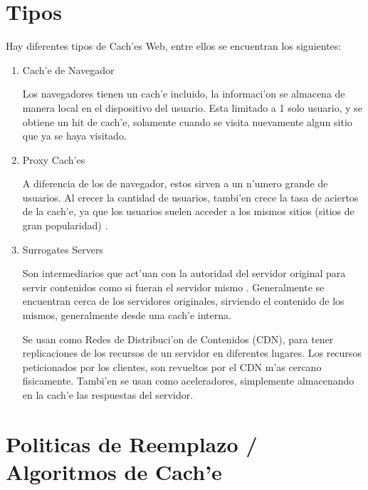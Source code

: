\section{Tipos}

Hay diferentes tipos de Cach'es Web, entre ellos se encuentran los siguientes:

\begin{enumerate}
\item Cach'e de Navegador

Los navegadores tienen un cach'e incluido, la informaci'on se almacena de manera local en el dispositivo del usuario. Esta limitado a 1 solo usuario, y se obtiene un hit de cach'e, solamente cuando se visita nuevamente algun sitio que ya se haya visitado.
\item Proxy Cach'es

A diferencia de los de navegador, estos sirven a un n'umero grande de usuarios. Al crecer la cantidad de usuarios, tambi'en crece la tasa de aciertos de la cach'e, ya que los usuarios suelen acceder a los mismos sitios (sitios de gran popularidad) \citep{duska}.
\item Surrogates Servers

Son intermediarios que act'uan con la autoridad del servidor original para servir contenidos como si fueran el servidor mismo \citep{edgeArch}. Generalmente se encuentran cerca de los servidores originales, sirviendo el contenido de los mismos, generalmente desde una cach'e interna.

Se usan como Redes de Distribuci'on de Contenidos (CDN), para tener replicaciones de los recursos de un servidor en diferentes lugares. Los recursos peticionados por los clientes, son revueltos por el CDN m'as cercano fisicamente. Tambi'en se usan como aceleradores, simplemente almacenando en la cach'e las respuestas del servidor.
\end{enumerate}

\section{Politicas de Reemplazo / Algoritmos de Cach'e}

